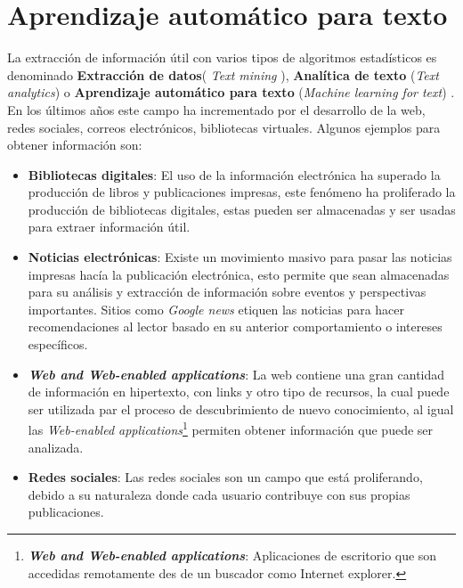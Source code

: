 
\section[AI para texto]{Aprendizaje automático para texto}

La extracción de información útil con varios tipos de algoritmos estadísticos es denominado \textbf{Extracción de datos}( \textit{Text mining} ), \textbf{Analítica de texto} (\textit{Text analytics}) o \textbf{Aprendizaje automático para texto} (\textit{Machine learning for text}) \citep{CD1}. En los últimos años este campo ha incrementado por el desarrollo de la web, redes sociales, correos electrónicos, bibliotecas virtuales. Algunos ejemplos para obtener información son:


\begin{itemize}

	\item \textbf{Bibliotecas digitales}: El uso de la información electrónica ha superado la producción de libros y publicaciones impresas, este fenómeno ha proliferado la producción de bibliotecas digitales, estas pueden ser almacenadas y ser usadas para extraer información útil.

	\item \textbf{Noticias electrónicas}: Existe un movimiento masivo para pasar las noticias impresas hacía la publicación electrónica, esto permite que sean almacenadas para su análisis y extracción de información sobre eventos y perspectivas importantes. Sitios como \textit{Google news} etiquen las noticias para hacer recomendaciones al lector basado en su anterior comportamiento o intereses específicos.

	\item \textbf{\textit{Web and Web-enabled applications}}: La web contiene una gran cantidad de información en hipertexto, con links y otro tipo de recursos, la cual puede ser utilizada par el proceso de descubrimiento de nuevo conocimiento, al igual las \textit{Web-enabled applications}\footnote{\textbf{\textit{Web and Web-enabled applications}}: Aplicaciones de escritorio que son  accedidas remotamente des de un buscador como Internet explorer.} permiten obtener información que puede ser analizada.

	\item \textbf{Redes sociales}: Las redes sociales son un campo que está proliferando, debido a su naturaleza donde cada usuario contribuye con sus propias publicaciones.

\end{itemize}


